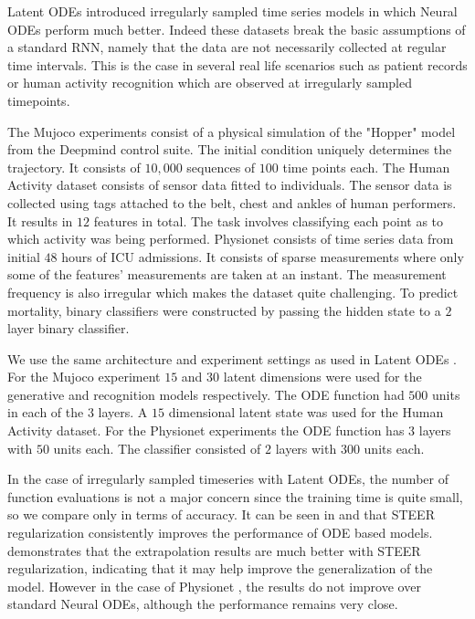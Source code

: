 Latent ODEs \cite{rubanova2019latent} introduced irregularly sampled time series models in which Neural ODEs perform much better. Indeed these datasets break the basic assumptions of a standard RNN, namely that the data are not necessarily collected at regular time intervals. This is the case in several real life scenarios such as patient records or human activity recognition which are observed at irregularly sampled timepoints. 

The Mujoco experiments consist of a physical simulation of the "Hopper" model from the Deepmind control suite. %
The initial condition uniquely determines the trajectory. It consists of $10,000$ sequences of $100$ time points each. 
The Human Activity dataset \cite{rubanova2019latent} consists of sensor data fitted to individuals. The sensor data is collected using tags attached to the belt, chest and ankles of human performers. It results in $12$ features in total. The task involves classifying each point as to which activity was being performed. Physionet \cite{silva2012predicting} consists of time series data from initial $48$ hours of ICU admissions. It consists of sparse measurements where only some of the features' measurements are taken at an instant. The measurement frequency is also irregular which makes the dataset quite challenging. To predict mortality, binary classifiers were constructed by passing the hidden state to a $2$ layer binary classifier.

We use the same architecture and experiment settings as used in Latent ODEs \cite{rubanova2019latent}. For the Mujoco experiment $15$ and $30$ latent dimensions were used for the generative and recognition models respectively. The ODE function had $500$ units in each of the $3$ layers. A $15$ dimensional latent state was used for the Human Activity dataset.  For the Physionet experiments the ODE function has $3$ layers with $50$ units each. The classifier consisted of $2$ layers with $300$ units each. 


In the case of irregularly sampled timeseries with Latent ODEs, the number of function evaluations is not a major concern since the training time is quite small, so we compare only in terms of accuracy. It can be seen in  and  that STEER regularization consistently improves the performance of ODE based models.   demonstrates that the extrapolation results are much better with STEER regularization, indicating that it may help improve the generalization of the model. However in the case of Physionet , the results do not improve over standard Neural ODEs, although the performance remains very close. 

